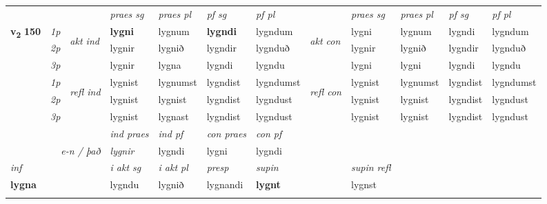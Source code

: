 \begin{longtable}[l]{X>{\footnotesize\itshape}llXXXXlXXXX}
 & &   & \textit{praes sg}  & \textit{praes pl}    & \textit{ pf sg} & \textit{pf pl} & & \textit{praes sg}  & \textit{praes pl}    & \textit{pf sg} & \textit{pf pl }  \\ \cmidrule{4-7} \cmidrule{9-12}
 \multirow{2}{*}{{{\textbf{v{\textsubscript{2}}} \Large{\textbf{150}}}}}  & 1p & \multirow{3}{*}{\begin{turn}{90}\textit{akt ind}\end{turn}} & \textbf{lygni} & lygnum & \textbf{lygndi} & lygndum & \multirow{3}{*}{\begin{turn}{90}\textit{akt con}\end{turn}} &lygni & lygnum & lygndi & lygndum\\*
 & 2p &  &  lygnir  & lygnið & lygndir & lygnduð & & lygnir & lygnið & lygndir & lygnduð \\*
 & 3p &  & lygnir & lygna & lygndi & lygndu & & lygni & lygni& lygndi & lygndu \\*
\cmidrule{4-7} \cmidrule{9-12}
 & 1p & \multirow{3}{*}{\begin{turn}{90}\textit{refl ind}\end{turn}}  & lygnist & lygnumst & lygndist & lygndumst & \multirow{3}{*}{\begin{turn}{90}\textit{refl con}\end{turn}}  &lygnist & lygnumst & lygndist & lygndumst \\*
 & 2p &  & lygnist & lygnist & lygndist & lygndust & &lygnist & lygnist & lygndist & lygndust \\*
 & 3p  & & lygnist & lygnast & lygndist & lygndust & & lygnist & lygnist& lygndist & lygndust \\*
\cmidrule{4-7} \cmidrule{9-12}

   && &  \textit{ind praes} & \textit{ind pf} & \textit{con praes} & \textit{con pf} \\*
\multicolumn{3}{r}{\textit{e-n / það}} & lygnir & lygndi & lygni & lygndi \\*

\cmidrule{4-7}
   {\textit{inf}} & &  & \textit{i akt sg} & \textit{i akt pl}   & \textit{presp} & \textit{supin} && \textit{supin refl}  \\*
  {\textbf{lygna}} & && lygndu  & lygnið   & lygnandi &  \textbf{lygnt} && lygnst  \\*

\midrule
  & \\
   \midrule


\end{longtable}
